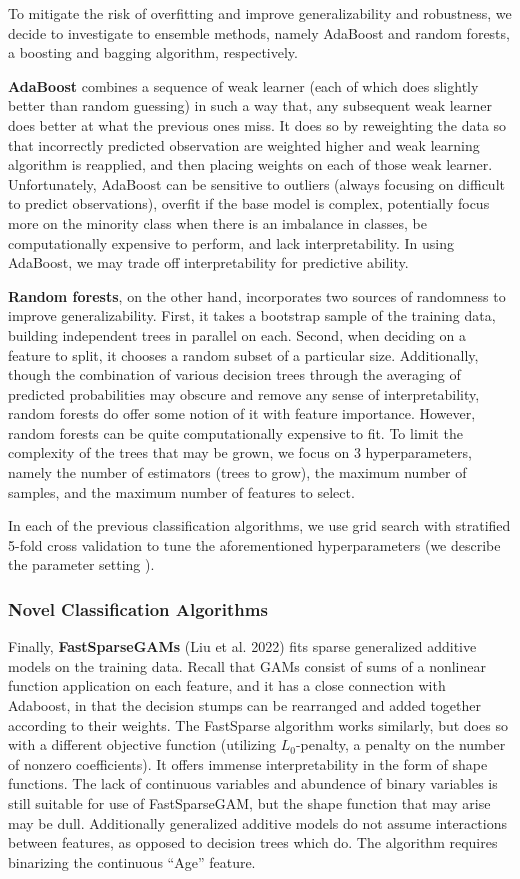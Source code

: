 \documentclass[12pt]{article}
\newtheorem{Proof of Lemma}{Proof of Lemma}
\begin{document}
To mitigate the risk of overfitting and improve generalizability and robustness, we decide to investigate to ensemble methods,
namely AdaBoost and random forests, a boosting and bagging algorithm, respectively. 

\textbf{AdaBoost} combines 
a sequence of weak learner (each of which does slightly better than random guessing) in such a way that, any subsequent weak learner does better at 
what the previous ones miss. It does so by reweighting the data so that incorrectly predicted observation are weighted higher and 
weak learning algorithm is reapplied, and then placing weights on each of those weak learner. Unfortunately, AdaBoost can be sensitive to 
outliers (always focusing on difficult to predict observations), overfit if the base model is complex, potentially focus more on the minority 
class when there is an imbalance in classes, be computationally expensive to perform, and lack interpretability. 
In using AdaBoost, we may trade off interpretability for predictive ability. 

\textbf{Random forests}, on the other hand, incorporates two sources of randomness to improve generalizability. First, it takes a bootstrap sample of 
the training data, building independent trees in parallel on each. Second, when deciding on a feature to split, it chooses a random subset of a particular
size. Additionally, though the combination of various decision trees through the averaging of predicted probabilities may obscure and remove any sense of 
interpretability, random forests do offer some notion of it with feature importance. However, random forests can be quite computationally expensive to fit.
To limit the complexity of the trees that may be grown, we focus on 3 hyperparameters, namely the number of estimators (trees to grow), the maximum number of 
samples, and the maximum number of features to select.  

In each of the previous classification algorithms, we use grid search with stratified 5-fold cross validation to tune the aforementioned hyperparameters (we describe the parameter setting ). 

\subsubsection{Novel Classification Algorithms}
Finally, \textbf{FastSparseGAMs} (Liu et al. 2022) fits sparse generalized additive models on the training data. Recall that GAMs consist of sums of a nonlinear function application on each feature,
and it has a close connection with Adaboost, in that the decision stumps can be rearranged and added together according to their weights. The FastSparse algorithm works similarly,
but does so with a different objective function (utilizing $L_0$-penalty, a penalty on the number of nonzero coefficients).
It offers immense interpretability in the form of shape functions. The lack of continuous variables and abundence of binary variables is still suitable for use of FastSparseGAM, but 
the shape function that may arise may be dull. Additionally generalized additive models do not assume interactions between features, as opposed to decision trees which do. 
The algorithm requires binarizing the continuous ``Age'' feature. 
\end{document}
